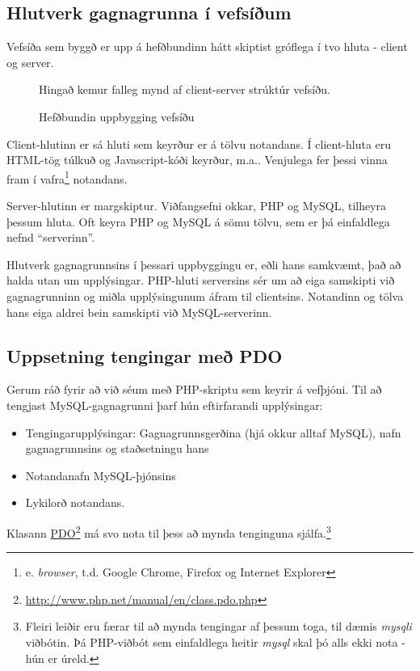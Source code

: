 \subsection{Hlutverk gagnagrunna í vefsíðum}
Vefsíða sem byggð er upp á hefðbundinn hátt skiptist gróflega í tvo hluta - client og server. 

\begin{figure}
\centering
\caption{Hefðbundin uppbygging vefsíðu}
\label{mynd:uppbyggingvefsidu}
\color{red} Hingað kemur falleg mynd af client-server strúktúr vefsíðu.
\end{figure}

Client-hlutinn er sá hluti sem keyrður er á tölvu notandans. Í client-hluta eru HTML-tög túlkuð og Javascript-kóði keyrður, m.a.. Venjulega fer þessi vinna fram í vafra\footnote{e. \emph{browser}, t.d. Google Chrome, Firefox og Internet Explorer} notandans.

Server-hlutinn er margskiptur. Viðfangsefni okkar, PHP og MySQL, tilheyra þessum hluta. Oft keyra PHP og MySQL á sömu tölvu, sem er þá einfaldlega nefnd ``serverinn''.

Hlutverk gagnagrunnsins í þessari uppbyggingu er, eðli hans samkvæmt, það að halda utan um upplýsingar. PHP-hluti serversins sér um að eiga samskipti við gagnagrunninn og miðla upplýsingunum áfram til clientsins. Notandinn og tölva hans eiga aldrei bein samskipti við MySQL-serverinn.

\subsection{Uppsetning tengingar með PDO}
Gerum ráð fyrir að við séum með PHP-skriptu sem keyrir á vefþjóni. Til að tengjast MySQL-gagnagrunni þarf hún eftirfarandi upplýsingar:
\begin{itemize}
 \item Tengingarupplýsingar: Gagnagrunnsgerðina (hjá okkur alltaf MySQL), nafn gagnagrunnsins og staðsetningu hans
 \item Notandanafn MySQL-þjónsins
 \item Lykilorð notandans.
\end{itemize}
Klasann \href{http://www.php.net/manual/en/class.pdo.php}{PDO}\footnote{\url{http://www.php.net/manual/en/class.pdo.php}} má svo nota til þess að mynda tenginguna sjálfa.\footnote{Fleiri leiðir eru færar til að mynda tengingar af þessum toga, til dæmis \emph{mysqli} viðbótin. Þá PHP-viðbót sem einfaldlega heitir \emph{mysql} skal þó alls ekki nota - hún er úreld.}

